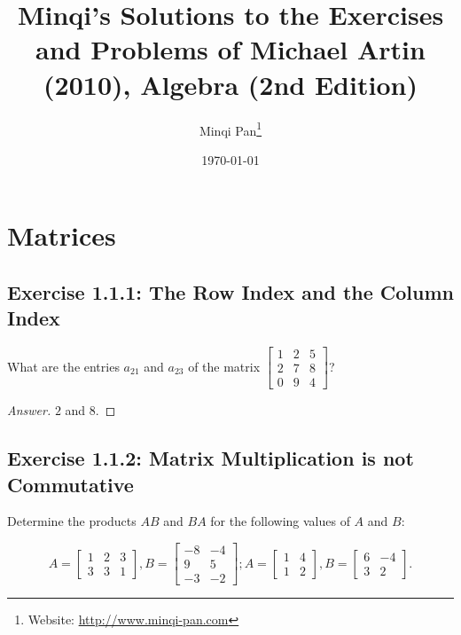 \documentclass{amsbook}
\theoremstyle{definition}
\theoremstyle{remark}
\numberwithin{section}{chapter}
\numberwithin{equation}{chapter}
\begin{document}
\frontmatter

\title{Minqi's Solutions to the Exercises and Problems of Michael Artin (2010), Algebra (2nd Edition)}

\author{Minqi Pan\footnote{Website: \href{http://www.minqi-pan.com}{http://www.minqi-pan.com}}}

\date{\today}

\maketitle

\setcounter{page}{4}

\tableofcontents

\mainmatter

\chapter{Matrices}

\section{Exercise 1.1.1: The Row Index and the Column Index}

What are the entries $a_{21}$ and $a_{23}$ of the matrix $\begin{bmatrix}
1 & 2 & 5\\
2 & 7 & 8\\
0 & 9 & 4
\end{bmatrix}$?

\begin{proof}[Answer]
$2$ and $8$.
\end{proof}

\section{Exercise 1.1.2: Matrix Multiplication is not Commutative}

Determine the products $AB$ and $BA$ for the following values of $A$ and $B$:

\[ A=\begin{bmatrix}
1&2&3\\
3&3&1
\end{bmatrix}, B=\begin{bmatrix}
-8 & -4\\
9  & 5\\
-3 & -2\end{bmatrix}; A=\begin{bmatrix}
1&4\\
1&2\end{bmatrix}, B=\begin{bmatrix}
6 & -4\\
3 & 2\end{bmatrix}. \]
\end{document}
